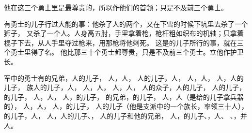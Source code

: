 {他在这三个勇士里是最尊贵的，所以作他们的首领；只是不及前三个勇士。
\par }{\PP {}有{}勇士{}的儿子{}行过大能的事：他杀了{}人{}的两个{}，又在下雪的时候下坑里去杀了一个狮子，
又杀了一个{}人。{}人身高五肘，手里拿着枪，枪杆粗如织布的机轴；{}只拿着棍子下去，从{}人手里夺过枪来，用那枪将他刺死。
这是{}的儿子{}所行的事，就在三个勇士里得了名。
他比那三十个勇士都尊贵，只是不及前三个勇士。{}立他作护卫长。
\par }{\PP {}军中的勇士有{}的兄弟{}，{}人{}的儿子{}，
人{}，{}人{}，
人{}的儿子{}，{}人{}，
人{}，{}人{}，
人{}，{}人{}的儿子{}，
族{}人{}的儿子{}，{}人{}，
人{}，{}人{}，
人{}，{}人{}，
人{}的众子，{}人{}的儿子{}，
人{}的儿子{}，{}的儿子{}，
人{}，{}人{}，
人{}，{}的儿子{}，
的兄弟{}，{}的儿子{}，
人{}，{}人{}（{}是给{}的儿子{}拿兵器的），
人{}，{}人{}，
人{}，{}的儿子{}，
人{}的儿子{}（他是{}支派中的一个族长，率领三十人），
的儿子{}，{}人{}，
人{}，{}人{}的儿子{}、{}，
人{}的儿子{}和他的兄弟{}，
人{}，{}的儿子{}、{}，{}人{}、
、{}，并{}人{}。

}
